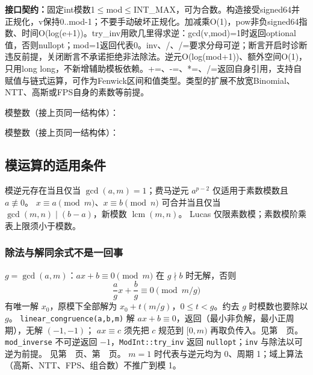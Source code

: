 {\sloppy{}\noindent\textbf{接口契约：}固定int模数1$\le$mod$\le$INT\_MAX，可为合数。构造接受signed64并正规化，v保持0..mod-1；不要手动破坏正规化。加减乘O(1)，pow非负signed64指数、时间O(log(e+1))。try\_inv用欧几里得求逆：gcd(v,mod)=1时返回optional值，否则nullopt；mod=1返回代表0。inv、/、/=要求分母可逆；断言开启时诊断违反前提，关闭断言不承诺拒绝非法除法。逆元O(log(mod+1))、额外空间O(1)，只用long long，不新增辅助模板依赖。+=、-=、*=、/=返回自身引用，支持自赋值与链式运算，可作为Fenwick区间和值类型。类型的扩展不放宽Binomial、NTT、高斯或FPS自身的素数等前提。\par}

\Needspace{545pt}



\newpage

\noindent 模整数（接上页同一结构体）：



\newpage

\noindent 模整数（接上页同一结构体）：



\newpage

\subsection{模运算的适用条件}\label{knowledge-modular-conditions}
模逆元存在当且仅当 $\gcd(a,m)=1$；费马逆元 $a^{p-2}$ 仅适用于素数模数且 $a\not\equiv0$。
$x\equiv a\pmod m$、$x\equiv b\pmod n$ 可合并当且仅当 $\gcd(m,n)\mid(b-a)$，新模数 $\operatorname{lcm}(m,n)$。
Lucas 仅限素数模；素数模阶乘表上限须小于模数。

\subsubsection{除法与解同余式不是一回事}
$g=\gcd(a,m)$：$ax+b\equiv0\pmod m$ 在 $g\nmid b$ 时无解，否则
\[
\frac ag x+\frac bg\equiv0\pmod{m/g}
\]
有唯一解 $x_0$，原模下全部解为 $x_0+t(m/g)$，$0\le t<g$。约去 $g$ 时模数也要除以 $g$。
\texttt{linear\_congruence(a,b,m)} 解 $ax+b\equiv0$，返回（最小非负解，最小正周期），无解 $(-1,-1)$；
$ax\equiv c$ 须先把 $c$ 规范到 $[0,m)$ 再取负传入。见第~\pageref{compact-linear_congruence}~页。
\texttt{mod\_inverse} 不可逆返回 $-1$，\texttt{ModInt::try\_inv} 返回 \texttt{nullopt}；\texttt{inv} 与除法以可逆为前提。
见第~\pageref{compact-mod_inverse}~页、第~\pageref{compact-ModInt}~页。
$m=1$ 时代表与逆元均为 0、周期 1；域上算法（高斯、NTT、FPS、组合数）不推广到模 1。

